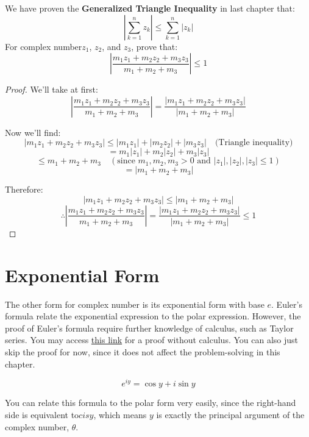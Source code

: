 \begin{exercise}
    We have proven the \textbf{Generalized Triangle Inequality} in last chapter that:
    $$\left|\sum_{k=1}^{n} z_{k}\right| \leq \sum_{k=1}^{n}\left|z_{k}\right|$$
    For complex number$z_1$, $z_2$, and $z_3$, prove that:
    $$\left|\frac{m_{1} z_{1}+m_{2} z_{2}+m_{3} z_{3}}{m_{1}+m_{2}+m_{3}}\right| \leq 1$$
\end{exercise}
\begin{proof}
    
We'll take at first:
\[
\left| \frac{m_1z_1 + m_2z_2 + m_3z_3}{m_1 + m_2 + m_3} \right| = \frac{\left| m_1z_1 + m_2z_2 + m_3z_3 \right|}{\left| m_1 + m_2 + m_3 \right|}
\]

Now we'll find:
\[
\left| m_1z_1 + m_2z_2 + m_3z_3 \right| \leq \left| m_1z_1 \right| + \left| m_2z_2 \right| + \left| m_3z_3 \right| \quad \text{(Triangle inequality)}
\]
\[
= m_1 \left| z_1 \right| + m_2 \left| z_2 \right| + m_3 \left| z_3 \right|
\]
\[
\leq m_1 + m_2 + m_3 \quad (\text{since } m_1, m_2, m_3 > 0 \text{ and } \left| z_1 \right|, \left| z_2 \right|, \left| z_3 \right| \leq 1)
\]
\[
= \left| m_1 + m_2 + m_3 \right|
\]

Therefore:
\[
\left| m_1z_1 + m_2z_2 + m_3z_3 \right| \leq \left| m_1 + m_2 + m_3 \right|
\]
\[
\therefore \left| \frac{m_1z_1 + m_2z_2 + m_3z_3}{m_1 + m_2 + m_3} \right| = \frac{\left| m_1z_1 + m_2z_2 + m_3z_3 \right|}{\left| m_1 + m_2 + m_3 \right|} \leq 1
\]
\end{proof}

\section{Exponential Form}
The other form for complex number is its exponential form with base $e$. Euler's formula relate the exponential
expression to the polar expression. However, the proof of Euler's formula require further knowledge of calculus, such as
Taylor series. You may access \href{https://www.youtube.com/watch?v=mvmuCPvRoWQ&t=78s}{this link} for a proof without
calculus. You can also just skip the proof for now, since it does not affect the problem-solving in this chapter.

\begin{definition}
    \begin{equation}
        e^{i y}=\cos y+i \sin y 
    \end{equation}
\end{definition}
You can relate this formula to the polar form very easily, since the right-hand side is equivalent to$cisy$,
which means $y$ is exactly the principal argument of the complex number, $\theta$.

